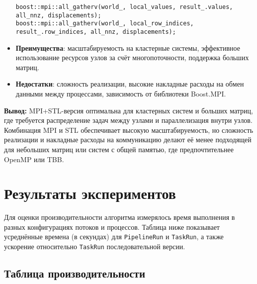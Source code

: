 \documentclass[12pt]{extarticle}
\begin{document}
\begin{itemize}
    \begin{lstlisting}[caption={Сбор глобальных результатов в методе GatherGlobalResults},label={lst:mpi_gather}]
boost::mpi::all_gatherv(world_, local_values, result_.values, all_nnz, displacements);
boost::mpi::all_gatherv(world_, local_row_indices, result_.row_indices, all_nnz, displacements);
    \end{lstlisting}
    \item \textbf{Преимущества}: масштабируемость на кластерные системы, эффективное использование ресурсов узлов за счёт многопоточности, поддержка больших матриц.
    \item \textbf{Недостатки}: сложность реализации, высокие накладные расходы на обмен данными между процессами, зависимость от библиотеки Boost.MPI.
\end{itemize}

\textbf{Вывод:} MPI+STL-версия оптимальна для кластерных систем и больших матриц, где требуется распределение задач между узлами и параллелизация внутри узлов. Комбинация MPI и STL обеспечивает высокую масштабируемость, но сложность реализации и накладные расходы на коммуникацию делают её менее подходящей для небольших матриц или систем с общей памятью, где предпочтительнее OpenMP или TBB.

\newpage
\section{Результаты экспериментов}

\hspace*{1.25cm}Для оценки производительности алгоритма измерялось время выполнения в разных конфигурациях потоков и процессов. Таблица ниже показывает усреднённые времена (в секундах) для \texttt{PipelineRun} и \texttt{TaskRun}, а также ускорение относительно \texttt{TaskRun} последовательной версии.

\subsection{Таблица производительности}
\end{document}
